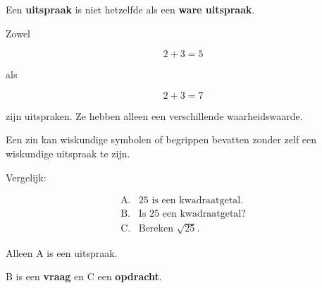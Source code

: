 \documentclass{ximera}
\begin{document}
\begin{opmerking}
Een \textbf{uitspraak} is niet hetzelfde als een
\textbf{ware uitspraak}.

Zowel

\[
2+3=5
\]

als

\[
2+3=7
\]

zijn uitspraken. Ze hebben alleen een verschillende waarheidswaarde.
\end{opmerking}



Een zin kan wiskundige symbolen of begrippen bevatten zonder zelf een
wiskundige uitspraak te zijn.

Vergelijk:

\[
\begin{array}{ll}
\text{A.} & 25\text{ is een kwadraatgetal.}\\
\text{B.} & \text{Is }25\text{ een kwadraatgetal?}\\
\text{C.} & \text{Bereken }\sqrt{25}.
\end{array}
\]

Alleen A is een uitspraak.

B is een \textbf{vraag} en C een \textbf{opdracht}.
\end{document}
